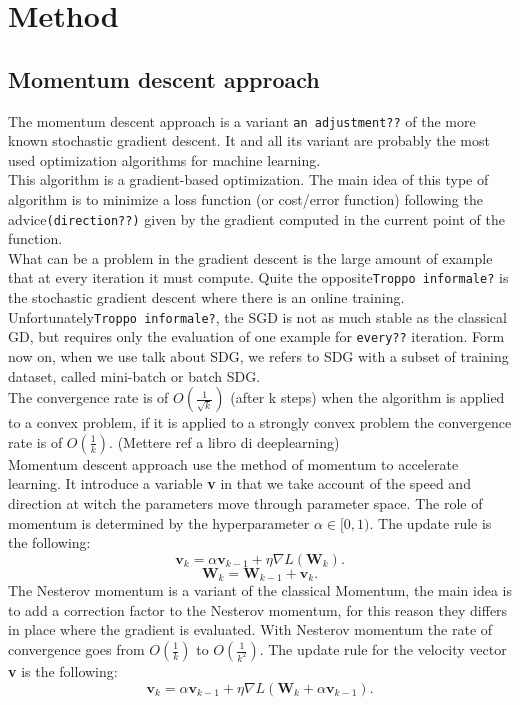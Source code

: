\section{Method}

\subsection{Momentum descent approach}
The momentum descent approach is a variant \texttt{an adjustment??} of the more known stochastic gradient descent. It and all its variant are probably the most used optimization algorithms for machine learning.\\
This algorithm is a gradient-based optimization. The main idea of this type of algorithm is to minimize a loss function (or cost/error function) following the advice\texttt{(direction??)} given by the gradient computed in the current point of the function.
\\
What can be a problem in the gradient descent is the large amount of example that at every iteration it must compute. Quite the opposite\texttt{Troppo informale?} is the stochastic gradient descent where there is an online training. Unfortunately\texttt{Troppo informale?}, the SGD is not as much stable as the classical GD, but requires only the evaluation of one example for \texttt{every??} iteration. 
Form now on, when we use talk about SDG, we refers to SDG with a subset of training dataset, called mini-batch or batch SDG.
\\
The convergence rate is of $O(\frac{1}{\sqrt{k}})$ (after k steps) when the algorithm is applied to a convex problem, if it is applied to a strongly convex problem the convergence rate is of $O(\frac{1}{k})$. (Mettere ref a libro di deeplearning)
\\
Momentum descent approach use the method of momentum to accelerate learning. It introduce a variable \textbf{v} in that we take account of the speed and direction at witch the parameters move through parameter space. The role of momentum is determined by the hyperparameter $\alpha\in[0,1)$.
The update rule is the following:
\begin{equation}
\label{classical_momentum}
\textbf{v}_k = \alpha\textbf{v}_{k-1} + \eta\nabla\textit{L}(\textbf{W}_k).
\end{equation}
\begin{equation}
\label{update_momentum}
\textbf{W}_k = \textbf{W}_{k-1}  + \textbf{v}_k.
\end{equation}
The Nesterov momentum is a variant of the classical Momentum, the main idea is to add a correction factor to the Nesterov momentum,  for this reason they differs in place where the gradient is evaluated. With Nesterov momentum the rate of convergence goes from $O(\frac{1}{k})$ to $O(\frac{1}{k^2})$.
The update rule for the velocity vector \textbf{v} is the following:
\begin{equation}
\label{nesterov_momentum}
\textbf{v}_k = \alpha\textbf{v}_{k-1} + \eta\nabla\textit{L}(\textbf{W}_k + \alpha\textbf{v}_{k-1}).
\end{equation}
